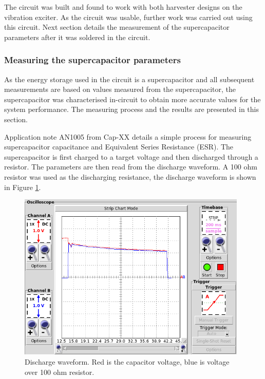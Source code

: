 The circuit was built and found to work with both harvester designs on the vibration exciter. As the circuit was usable, further work was carried out using this circuit. Next section details the measurement of the supercapacitor parameters after it was soldered in the circuit.

\subsubsection{Measuring the supercapacitor parameters}
As the energy storage used in the circuit is a supercapacitor and all subsequent measurements are based on values measured from the supercapacitor, the supercapacitor was characterised in-circuit to obtain more accurate values for the system performance. The measuring process and the results are presented in this section.

Application note AN1005 from Cap-XX \cite{an1005} details a simple process for measuring supercapacitor capacitance and Equivalent Series Resistance (ESR). The supercapacitor is first charged to a target voltage and then discharged through a resistor. The parameters are then read from the discharge waveform. A 100 ohm resistor was used as the discharging resistance, the discharge waveform is shown in Figure \ref{fig:scap_discharge}. 

\begin{figure}[htb]
\begin{center}
\includegraphics[height=8cm]{images/own_measurement/circuit/discharge.png}
\end{center}
\caption{\label{fig:scap_discharge} Discharge waveform. Red is the capacitor voltage, blue is voltage over 100 ohm resistor.}
\end{figure}

